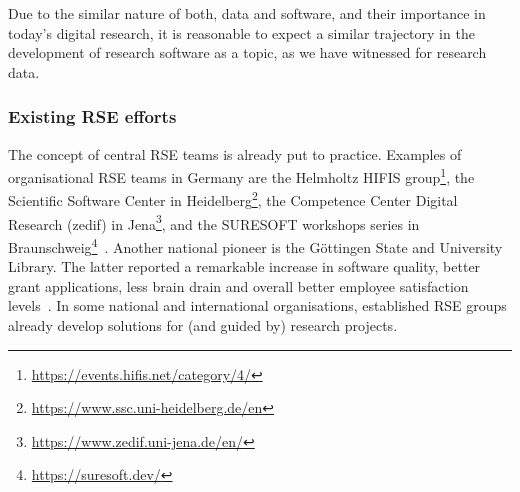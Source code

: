 \documentclass[a4paper]{article}
\makeatletter
\newcommand*{\eg}{e.\,g.\@\xspace}
\makeatother
\begin{document}
Due to the similar nature of both, data and software, and their importance in today's digital research, it is reasonable to expect a similar trajectory in the development of research software as a topic, as we have witnessed for research data.

\subsubsection{Existing RSE efforts}
The concept of central RSE teams is already put to practice.
Examples  of organisational RSE teams in Germany are
 the Helmholtz HIFIS group\footnote{\url{https://events.hifis.net/category/4/}}\autocite{haupt_hifis_consulting_2021},
 the Scientific Software Center in Heidelberg\footnote{\url{https://www.ssc.uni-heidelberg.de/en}}\autocite{ulusoy_heidelberg_ssc_2024},
 the Competence Center Digital Research (zedif) in Jena\footnote{\url{https://www.zedif.uni-jena.de/en/}},
 and the SURESOFT workshops series in Braunschweig\footnote{\url{https://suresoft.dev/}}~\autocite{Blech2022}.
Another national pioneer is the Göttingen State and University Library.
The latter reported a remarkable increase in software quality, better grant applications, less brain drain and overall better employee satisfaction levels~\autocite{schimavoigt2023}.
In some national and international organisations, established RSE groups already develop solutions for (and guided by) research projects.
\end{document}
